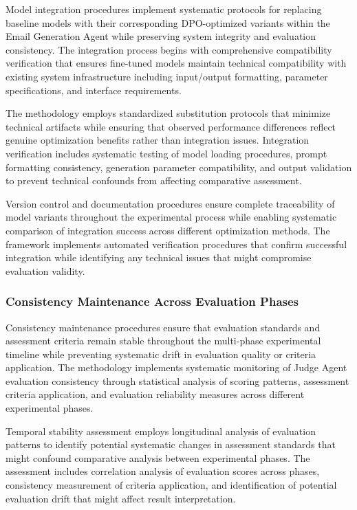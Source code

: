 Model integration procedures implement systematic protocols for replacing baseline models with their corresponding DPO-optimized variants within the Email Generation Agent while preserving system integrity and evaluation consistency. The integration process begins with comprehensive compatibility verification that ensures fine-tuned models maintain technical compatibility with existing system infrastructure including input/output formatting, parameter specifications, and interface requirements.

The methodology employs standardized substitution protocols that minimize technical artifacts while ensuring that observed performance differences reflect genuine optimization benefits rather than integration issues. Integration verification includes systematic testing of model loading procedures, prompt formatting consistency, generation parameter compatibility, and output validation to prevent technical confounds from affecting comparative assessment.

Version control and documentation procedures ensure complete traceability of model variants throughout the experimental process while enabling systematic comparison of integration success across different optimization methods. The framework implements automated verification procedures that confirm successful integration while identifying any technical issues that might compromise evaluation validity.

\subsubsection{Consistency Maintenance Across Evaluation Phases}

Consistency maintenance procedures ensure that evaluation standards and assessment criteria remain stable throughout the multi-phase experimental timeline while preventing systematic drift in evaluation quality or criteria application. The methodology implements systematic monitoring of Judge Agent evaluation consistency through statistical analysis of scoring patterns, assessment criteria application, and evaluation reliability measures across different experimental phases.

Temporal stability assessment employs longitudinal analysis of evaluation patterns to identify potential systematic changes in assessment standards that might confound comparative analysis between experimental phases. The assessment includes correlation analysis of evaluation scores across phases, consistency measurement of criteria application, and identification of potential evaluation drift that might affect result interpretation.

